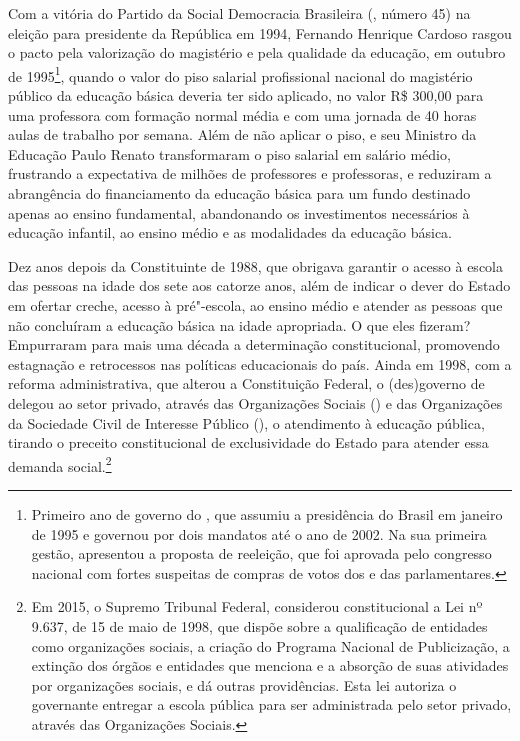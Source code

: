Com a vitória do Partido da Social Democracia Brasileira (, número
45) na eleição para presidente da República em 1994, Fernando Henrique
Cardoso rasgou o pacto pela valorização do magistério e pela qualidade
da educação, em outubro de 1995\footnote{Primeiro ano de governo do ,
  que assumiu a presidência do Brasil em janeiro de 1995 e governou por
  dois mandatos até o ano de 2002. Na sua primeira gestão, apresentou a
  proposta de reeleição, que foi aprovada pelo congresso nacional com
  fortes suspeitas de compras de votos dos e das parlamentares.}, quando
o valor do piso salarial profissional nacional do magistério público da
educação básica deveria ter sido aplicado, no valor R\$ 300,00 para uma
professora com formação normal média e com uma jornada de 40 horas aulas
de trabalho por semana. Além de não aplicar o piso,  e seu Ministro
da Educação Paulo Renato transformaram o piso salarial em salário médio,
frustrando a expectativa de milhões de professores e professoras, e
reduziram a abrangência do financiamento da educação básica para um fundo
destinado apenas ao ensino fundamental, abandonando os investimentos
necessários à educação infantil, ao ensino médio e as modalidades da
educação básica.

Dez anos depois da Constituinte de 1988, que obrigava garantir o acesso
à escola das pessoas na idade dos sete aos catorze anos, além de
indicar o dever do Estado em ofertar creche, acesso à pré"-escola, ao
ensino médio e atender as pessoas que não concluíram a educação básica
na idade apropriada. O que eles fizeram? Empurraram para mais uma década
a determinação constitucional, promovendo estagnação e retrocessos nas
políticas educacionais do país. Ainda em 1998, com a reforma
administrativa, que alterou a Constituição Federal, o (des)governo de
 delegou ao setor privado, através das Organizações Sociais () e
das Organizações da Sociedade Civil de Interesse Público (), o
atendimento à educação pública, tirando o preceito constitucional de
exclusividade do Estado para atender essa demanda social.\footnote{Em
  2015, o Supremo Tribunal Federal, considerou constitucional a
  Lei nº 9.637, de 15 de maio de 1998, que dispõe sobre a
  qualificação de entidades como organizações sociais, a criação do
  Programa Nacional de Publicização, a extinção dos órgãos e entidades
  que menciona e a absorção de suas atividades por organizações sociais,
  e dá outras providências. Esta lei autoriza o governante entregar a
  escola pública para ser administrada pelo setor privado, através das
  Organizações Sociais.}

